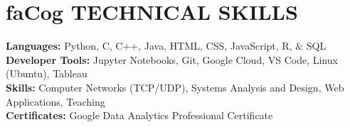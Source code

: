 \documentclass[a4paper,11pt]{article}
\newcommand{\seticon}[1]{\textcolor{Cerulean}{\csname #1\endcsname}}
\begin{document}
\section{\seticon{faCog} \textbf{TECHNICAL SKILLS}} %
\begin{itemize}[leftmargin=0.15in, label={}]
    \small{\item{
     \textbf{Languages:}{ Python, C, C++, Java, HTML, CSS, JavaScript, R, $\&$ SQL} \\		   
    \textbf{Developer Tools:}{ Jupyter Notebooks, Git, Google Cloud, VS Code, Linux (Ubuntu), Tableau}\\
    \textbf{Skills:}{ Computer Networks (TCP/UDP), Systems Analysis and Design, Web Applications, Teaching}\\ 
    \textbf{Certificates:}{ Google Data Analytics Professional Certificate}\\
    }}
 \end{itemize} \vspace{-13pt}
\end{document}
